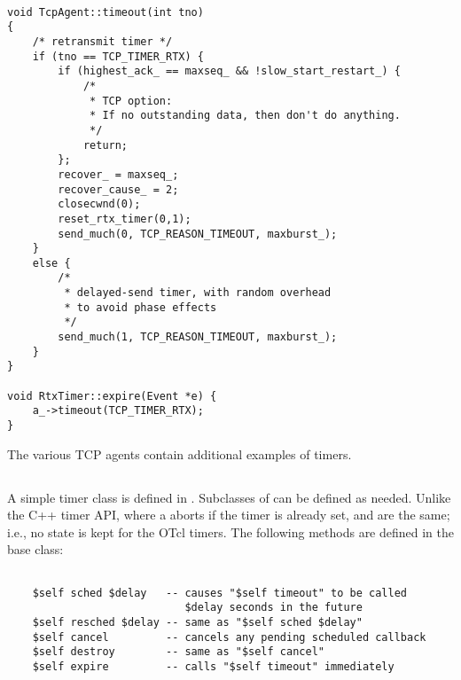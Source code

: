\begin{small}
\begin{verbatim}

void TcpAgent::timeout(int tno)
{                     
    /* retransmit timer */
    if (tno == TCP_TIMER_RTX) {
        if (highest_ack_ == maxseq_ && !slow_start_restart_) {
            /*
             * TCP option:
             * If no outstanding data, then don't do anything.
             */
            return;  
        };
        recover_ = maxseq_;
        recover_cause_ = 2;
        closecwnd(0);
        reset_rtx_timer(0,1);
        send_much(0, TCP_REASON_TIMEOUT, maxburst_); 
    }       
    else {  
        /*  
         * delayed-send timer, with random overhead
         * to avoid phase effects  
         */     
        send_much(1, TCP_REASON_TIMEOUT, maxburst_);
    }           
}           
            
void RtxTimer::expire(Event *e) {
    a_->timeout(TCP_TIMER_RTX);
}

\end{verbatim}
\end{small}

The various TCP agents contain additional examples of timers.

\subsection{}

A simple timer class is defined in .  Subclasses of
 can be defined as needed.  Unlike the C++ timer API, where a 
 aborts if the timer is already set,  and
 are the same; i.e., no state is kept for the OTcl timers.
The following methods are defined in the  base class:
\begin{small}
\begin{verbatim}

    $self sched $delay   -- causes "$self timeout" to be called 
                            $delay seconds in the future
    $self resched $delay -- same as "$self sched $delay" 
    $self cancel         -- cancels any pending scheduled callback
    $self destroy        -- same as "$self cancel"
	$self expire         -- calls "$self timeout" immediately

\end{verbatim}
\end{small}
